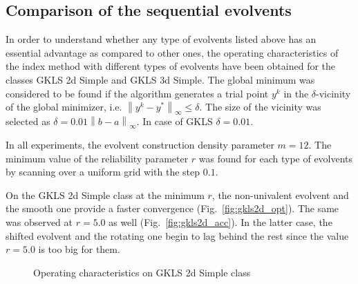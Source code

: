 \documentclass[runningheads]{llncs}
\begin{document}
\subsection{Comparison of the sequential evolvents}
\label{sec:seq_comp}
In order to understand whether any type of evolvents listed above has an essential advantage as
compared to other ones, the operating characteristics of the index method with different types
of evolvents have been obtained for the classes GKLS 2d Simple and GKLS 3d Simple. The
global minimum was considered to be found if the algorithm generates a trial point $y^k$ in the
$\delta$-vicinity of the global minimizer, i.e. $\left\|y^k-y^\ast\right\|_\infty\leq\delta$. The size
of the vicinity was selected as $\delta = 0.01\left\|b-a\right\|_\infty$. In case of GKLS
$\delta=0.01$.

In all experiments, the evolvent construction density parameter $m=12$. The minimum value of
the reliability parameter \(r\) was found for each type of evolvents by scanning over a uniform grid
with the step \(0.1\).

On the GKLS 2d Simple class at the minimum \(r\), the non-univalent evolvent and the smooth
one provide a faster convergence (Fig.~\ref{fig:gkls2d_opt}). The same was observed at
\(r=5.0\) as well (Fig.~\ref{fig:gkls2d_acc}). In the latter case, the shifted evolvent and the
rotating one begin to lag behind the rest since the value \(r=5.0\) is too big for them.
\begin{figure}[ht]
    \centering

    \caption{Operating characteristics on GKLS 2d Simple class}
\end{figure}
\end{document}
